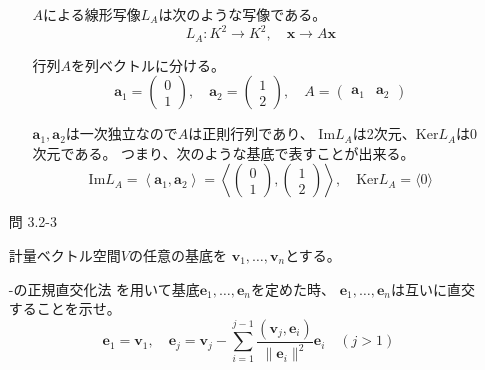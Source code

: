 \documentclass[12pt,b5paper]{ltjsarticle}
\begin{document}
\begin{enumerate}
\begin{enumerate}
             \dotfill

             $A$による線形写像$L_A$は次のような写像である。
             \begin{equation}
              L_A : K^2 \to K^2 ,\quad \bm{x} \to A\bm{x}
             \end{equation}

             行列$A$を列ベクトルに分ける。
             \begin{equation}
              \bm{a}_1= \begin{pmatrix} 0 \\ 1 \end{pmatrix}
              ,\quad
              \bm{a}_2= \begin{pmatrix} 1 \\ 2 \end{pmatrix}
              ,\quad
               A=\begin{pmatrix} \bm{a}_1 & \bm{a}_2 \end{pmatrix}
             \end{equation}

             $\bm{a}_1,\bm{a}_2$は一次独立なので$A$は正則行列であり、
             $\mathrm{Im}L_A$は2次元、$\mathrm{Ker}L_A$は0次元である。
             つまり、次のような基底で表すことが出来る。
             \begin{equation}
              \mathrm{Im}L_A
               =\left\langle \bm{a}_1,\bm{a}_2 \right\rangle
               =\left\langle
                 \begin{pmatrix} 0 \\ 1 \end{pmatrix}
                 ,
                 \begin{pmatrix} 1 \\ 2 \end{pmatrix}
                \right\rangle
               ,\quad
              \mathrm{Ker}L_A
              =\langle 0 \rangle
             \end{equation}


             \hrulefill

       \end{enumerate}


 \item [問 3.2-3]

       計量ベクトル空間$V$の任意の基底を
       $\bm{v}_1,\dots,\bm{v}_n$とする。

       -の正規直交化法
       を用いて基底$\bm{e}_1,\dots,\bm{e}_n$を定めた時、
       $\bm{e}_1,\dots,\bm{e}_n$は互いに直交することを示せ。
       \begin{equation}
        \bm{e}_1=\bm{v}_1,\quad
        \bm{e}_j
         =\bm{v}_j
         - \sum_{i=1}^{j-1}
         \frac{(\bm{v}_j,\bm{e}_i)}{\|\bm{e}_i\|^2}\bm{e}_i
         \quad (j>1)
       \end{equation}


\end{enumerate}
\end{document}
